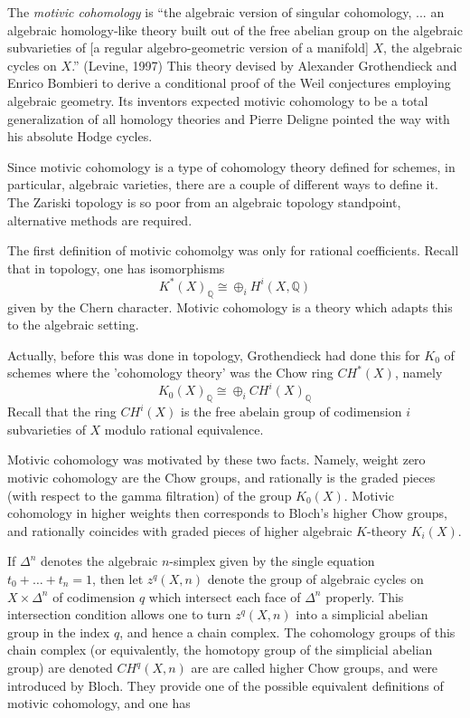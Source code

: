 \documentclass[12pt]{article}
\begin{document}
The {\em motivic cohomology} is ``the algebraic version of singular cohomology, ... an algebraic homology-like theory built out of the
free abelian group on the algebraic subvarieties of [a regular algebro-geometric version of a manifold] $X$, the algebraic cycles on $X$.'' (Levine, 1997) This theory devised by Alexander Grothendieck and Enrico Bombieri to derive a conditional proof of the Weil conjectures employing algebraic geometry. Its inventors expected motivic cohomology to be a total generalization of all homology theories and Pierre Deligne pointed the way with his absolute Hodge cycles.

Since motivic cohomology is a type of cohomology theory defined for schemes, in particular, algebraic varieties, there are a couple of different ways to define it. The Zariski topology is so poor from an algebraic topology standpoint, alternative methods are required.

The first definition of motivic cohomolgy was only for rational coefficients. Recall that in topology, one has isomorphisms
$$ K^*(X)_\mathbb{Q} \cong \oplus_i H^i(X,\mathbb{Q})$$
given by the Chern character. Motivic cohomology is a theory which adapts this to the algebraic setting.

Actually, before this was done in topology, Grothendieck had done this for $K_0$ of schemes where the 'cohomology theory' was the Chow ring $CH^*(X)$, namely
$$ K_0(X)_\mathbb{Q} \cong \oplus_i CH^i(X)_\mathbb{Q}$$
Recall that the ring $CH^i(X)$ is the free abelain group of codimension $i$ subvarieties of $X$ modulo rational equivalence.

Motivic cohomology was motivated by these two facts. Namely, weight zero motivic cohomology are the Chow groups, and rationally is the graded pieces (with respect to the gamma filtration) of the group $K_0(X)$. Motivic cohomology in higher weights then corresponds to Bloch's higher Chow groups, and rationally coincides with graded pieces of higher algebraic $K$-theory $K_i(X)$.

If $\Delta^n$ denotes the algebraic $n$-simplex given by the single equation $t_0 + \ldots + t_n = 1$, then let $z^q(X,n)$ denote the group of algebraic cycles on $X \times \Delta^n$ of codimension $q$ which intersect each face of $\Delta^n$ properly. This intersection condition allows one to turn $z^q(X,n)$ into a simplicial abelian group in the index $q$, and hence a chain complex. The cohomology groups of this chain complex (or equivalently, the homotopy group of the simplicial abelian group) are denoted $CH^q(X,n)$ are are called higher Chow groups, and were introduced by Bloch. They provide one of the possible equivalent definitions of motivic cohomology, and one has
\end{document}
